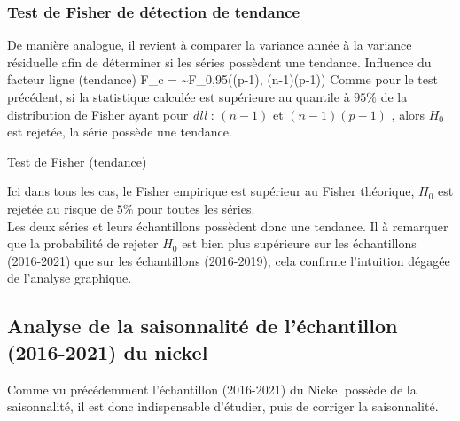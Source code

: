 \subsubsection{Test de Fisher de détection de tendance}
De manière analogue, il revient à comparer la variance année à la variance résiduelle afin de déterminer si les séries possèdent une tendance.
    {Influence du facteur ligne (tendance)}
    {F_{c} =  \sim F_{0,95}((p-1), (n-1)(p-1))}
Comme pour le test précédent, si la statistique calculée est supérieure au quantile à $ 95\% $ 
de la distribution de Fisher ayant pour \textit{dll} : $(n-1)$ et $(n-1)(p-1)$ , alors $ H_{0} $ est rejetée, la série possède une tendance.
\begin{table}[H]
    \centering
    \caption{Test de Fisher (tendance)}
    \sffamily
    
\end{table}
Ici dans tous les cas, le Fisher empirique est supérieur au Fisher théorique, $H_{0}$ est rejetée
au risque de $ 5\% $ pour toutes les séries. \\[11pt]
Les deux séries et leurs échantillons possèdent donc une tendance. Il à remarquer que la probabilité de rejeter 
$H_{0}$ est bien plus supérieure sur les échantillons (2016-2021) que sur les échantillons (2016-2019),
cela confirme l'intuition dégagée de l'analyse graphique.

\subsection{Analyse de la saisonnalité de l'échantillon (2016-2021) du nickel}
Comme vu précédemment l'échantillon (2016-2021) du Nickel possède de la saisonnalité, il est donc indispensable d'étudier, puis de corriger la saisonnalité. 
